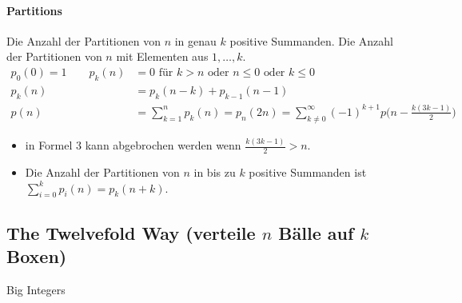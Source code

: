 \paragraph{Partitions}
Die Anzahl der Partitionen von $n$ in genau $k$ positive Summanden.
Die Anzahl der Partitionen von $n$ mit Elementen aus ${1,\dots,k}$.
\begin{align*}
	p_0(0)=1 \qquad p_k(n)&=0 \text{ für } k > n \text{ oder } n \leq 0 \text{ oder } k \leq 0\\
	p_k(n)&= p_k(n-k) + p_{k-1}(n-1)\\[2pt]
	p(n)&=\sum_{k=1}^{n} p_k(n)=p_n(2n)=\sum\limits_{k\neq0}^\infty(-1)^{k+1}p\bigg(n - \frac{k(3k-1)}{2}\bigg)
\end{align*}
\begin{itemize}
	\item in Formel $3$ kann abgebrochen werden wenn $\frac{k(3k-1)}{2} > n$.
	\item Die Anzahl der Partitionen von $n$ in bis zu $k$ positive Summanden ist $\sum\limits_{i=0}^{k}p_i(n)=p_k(n+k)$.
\end{itemize}

\subsection{The Twelvefold Way \textnormal{(verteile $n$ Bälle auf $k$ Boxen)}}


%

\begin{algorithm}[optional]{Big Integers}
\end{algorithm}
